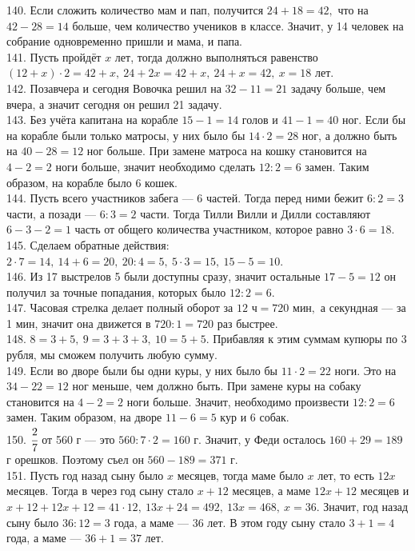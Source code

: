 \documentclass[12pt]{article}
\begin{document}
140. Если сложить количество мам и пап, получится $24+18=42,$ что на $42-28=14$ больше, чем количество учеников в классе. Значит, у 14 человек на собрание одновременно пришли и мама, и папа.\\
141. Пусть пройдёт $x$ лет, тогда должно выполняться равенство $(12+x)\cdot2=42+x,\ 24+2x=42+x,\ 24+x=42,\ x=18$ лет.\\
142. Позавчера и сегодня Вовочка решил на $32-11=21$ задачу больше, чем вчера, а значит сегодня он решил 21 задачу.\\
143. Без учёта капитана на корабле $15-1=14$ голов и $41-1=40$ ног. Если бы на корабле были только матросы, у них было бы $14\cdot2=28$ ног, а должно быть на $40-28=12$ ног больше. При замене матроса на кошку становится на $4-2=2$ ноги больше, значит необходимо сделать $12:2=6$ замен. Таким образом, на корабле было 6 кошек.\\
144. Пусть всего участников забега --- 6 частей. Тогда перед ними бежит $6:2=3$ части, а позади --- $6:3=2$ части. Тогда Тилли Вилли и Дилли составляют $6-3-2=1$ часть от общего количества участником, которое равно $3\cdot6=18.$\\
145. Сделаем обратные действия: $2\cdot7=14,\ 14+6=20,\ 20:4=5,\ 5\cdot3=15,\ 15-5=10.$\\
146. Из 17 выстрелов 5 были доступны сразу, значит остальные $17-5=12$ он получил за точные попадания, которых было $12:2=6.$\\
147. Часовая стрелка делает полный оборот за $12\text{ ч}=720\text{ мин},$ а секундная --- за 1 мин, значит она движется в $720:1=720$ раз быстрее.\\
148. $8=3+5,\ 9=3+3+3,\ 10=5+5.$ Прибавляя к этим суммам купюры по 3 рубля, мы сможем получить любую сумму.\\
149. Если во дворе были бы одни куры, у них было бы $11\cdot2=22$ ноги. Это на $34-22=12$ ног меньше, чем должно быть. При замене куры на собаку становится на $4-2=2$ ноги больше. Значит, необходимо произвести $12:2=6$ замен. Таким образом, на дворе $11-6=5$ кур и 6 собак.\\
150. $\cfrac{2}{7}$ от 560 г --- это $560:7\cdot2=160$ г. Значит, у Феди осталось $160+29=189$ г орешков. Поэтому съел он $560-189=371$ г.\\
151. Пусть год назад сыну было $x$ месяцев, тогда маме было $x$ лет, то есть $12x$ месяцев. Тогда в через год сыну стало $x+12$ месяцев, а маме $12x+12$ месяцев
и $x+12+12x+12=41\cdot12,\ 13x+24=492,\ 13x=468,\ x=36.$ Значит, год назад сыну было $36:12=3$ года, а маме --- 36 лет. В этом году сыну стало $3+1=4$ года, а маме --- $36+1=37$ лет.\\
\end{document}
